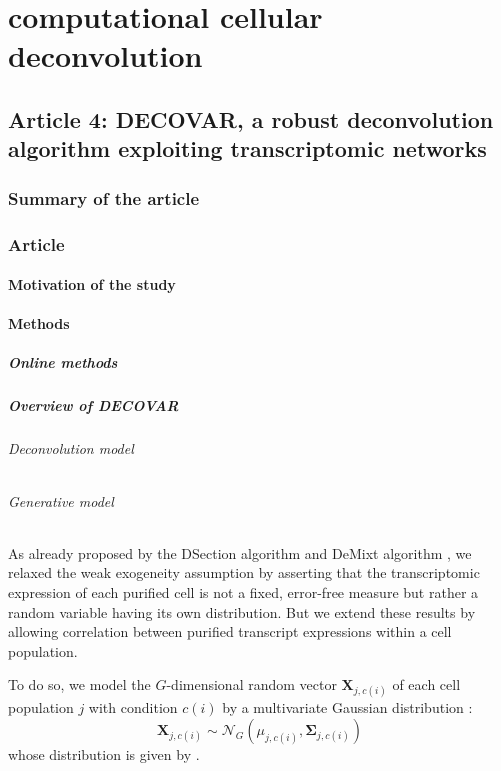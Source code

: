 \chapter{computational cellular deconvolution}
\section{Article 4: DECOVAR, a robust deconvolution algorithm exploiting transcriptomic networks}

\subsection{Summary of the article}
\subsection{Article}

\subsubsection{Motivation of the study}

\subsubsection{Methods}

\paragraph{Online methods}

\paragraph{Overview of DECOVAR}
\subparagraph{Deconvolution model}
\clearpage
\subparagraph{Generative model}

As already proposed by the DSection algorithm \parencite{erkkila_etal10} and DeMixt algorithm \parencite{wang_etal18}, we relaxed the weak \gls{exogeneity} assumption by asserting that the transcriptomic expression of each purified cell is not a fixed, error-free measure but rather a random variable having its own distribution. But we extend these results by allowing correlation between purified transcript expressions within a cell population.

To do so, we model the $G$-dimensional random vector $\boldsymbol{X}_{j, c(i)}$ of each cell population $j$ with condition $c(i)$ by a multivariate Gaussian distribution :
\begin{equation}
\label{eq:10}
\boldsymbol{X}_{j, c(i)} \sim \mathcal{N}_G(\mu_{j, c(i)}, \boldsymbol{\Sigma}_{j, c(i)})
\end{equation}
whose distribution is given by .

